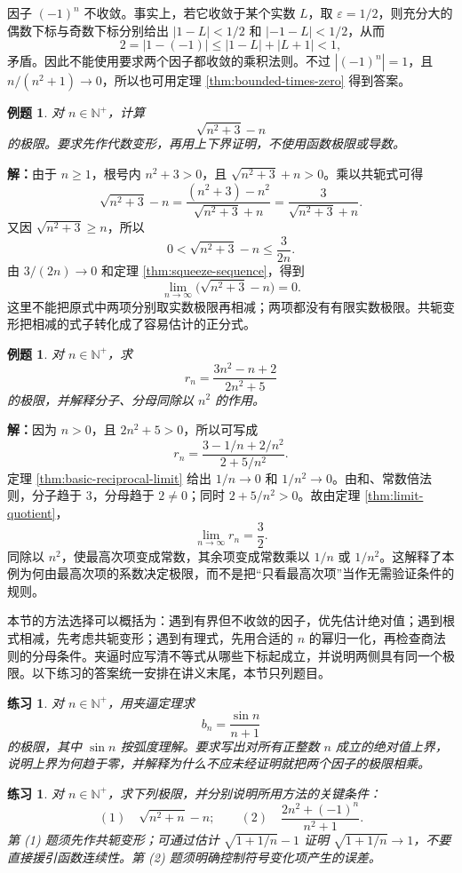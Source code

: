 \documentclass[UTF8,fontset=fandol,11pt]{ctexart}
\newtheorem{example}[definition]{例题}
\newtheorem{exercise}[definition]{练习}
\begin{document}
因子 $(-1)^n$ 不收敛。事实上，若它收敛于某个实数 $L$，取 $\varepsilon=1/2$，则充分大的偶数下标与奇数下标分别给出 $|1-L|<1/2$ 和 $|-1-L|<1/2$，从而
\[
2=|1-(-1)|\leq|1-L|+|L+1|<1,
\]
矛盾。因此不能使用要求两个因子都收敛的乘积法则。不过 $|(-1)^n|=1$，且 $n/(n^2+1)\to0$，所以也可用定理 \ref{thm:bounded-times-zero} 得到答案。\par
\begin{example}
对 $n\in\mathbb{N}^{+}$，计算
\[
\sqrt{n^2+3}-n
\]
的极限。要求先作代数变形，再用上下界证明，不使用函数极限或导数。
\end{example}
\par\noindent\textbf{解：}由于 $n\geq1$，根号内 $n^2+3>0$，且 $\sqrt{n^2+3}+n>0$。乘以共轭式可得
\[
\sqrt{n^2+3}-n
=\frac{(n^2+3)-n^2}{\sqrt{n^2+3}+n}
=\frac3{\sqrt{n^2+3}+n}.
\]
又因 $\sqrt{n^2+3}\geq n$，所以
\[
0<\sqrt{n^2+3}-n\leq\frac3{2n}.
\]
由 $3/(2n)\to0$ 和定理 \ref{thm:squeeze-sequence}，得到
\[
\lim_{n\to\infty}\bigl(\sqrt{n^2+3}-n\bigr)=0.
\]
这里不能把原式中两项分别取实数极限再相减；两项都没有有限实数极限。共轭变形把相减的式子转化成了容易估计的正分式。\par
\begin{example}
对 $n\in\mathbb{N}^{+}$，求
\[
r_n=\frac{3n^2-n+2}{2n^2+5}
\]
的极限，并解释分子、分母同除以 $n^2$ 的作用。
\end{example}
\par\noindent\textbf{解：}因为 $n>0$，且 $2n^2+5>0$，所以可写成
\[
r_n=\frac{3-1/n+2/n^2}{2+5/n^2}.
\]
定理 \ref{thm:basic-reciprocal-limit} 给出 $1/n\to0$ 和 $1/n^2\to0$。由和、常数倍法则，分子趋于 $3$，分母趋于 $2\neq0$；同时 $2+5/n^2>0$。故由定理 \ref{thm:limit-quotient}，
\[
\lim_{n\to\infty}r_n=\frac32.
\]
同除以 $n^2$，使最高次项变成常数，其余项变成常数乘以 $1/n$ 或 $1/n^2$。这解释了本例为何由最高次项的系数决定极限，而不是把“只看最高次项”当作无需验证条件的规则。\par
本节的方法选择可以概括为：遇到有界但不收敛的因子，优先估计绝对值；遇到根式相减，先考虑共轭变形；遇到有理式，先用合适的 $n$ 的幂归一化，再检查商法则的分母条件。夹逼时应写清不等式从哪些下标起成立，并说明两侧具有同一个极限。以下练习的答案统一安排在讲义末尾，本节只列题目。\par
\begin{exercise}
\label{mathagent:exercise:719875ae20efa60af241c9d55317b3f3d0138435a92158cbcf8bf58b83fe99e4}
对 $n\in\mathbb{N}^{+}$，用夹逼定理求
\[
b_n=\frac{\sin n}{n+1}
\]
的极限，其中 $\sin n$ 按弧度理解。要求写出对所有正整数 $n$ 成立的绝对值上界，说明上界为何趋于零，并解释为什么不应未经证明就把两个因子的极限相乘。
\end{exercise}
\begin{exercise}
\label{mathagent:exercise:2d47f09098678baa1fb51b926189255a253f43fdfbb2aab80fc2d07fb1416ce0}
对 $n\in\mathbb{N}^{+}$，求下列极限，并分别说明所用方法的关键条件：
\[
(1)\quad \sqrt{n^2+n}-n;
\qquad
(2)\quad \frac{2n^2+(-1)^n}{n^2+1}.
\]
第 (1) 题须先作共轭变形；可通过估计 $\sqrt{1+1/n}-1$ 证明 $\sqrt{1+1/n}\to1$，不要直接援引函数连续性。第 (2) 题须明确控制符号变化项产生的误差。
\end{exercise}
\end{document}

